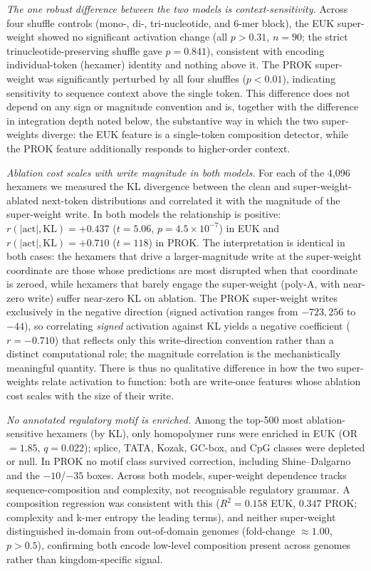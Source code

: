 \documentclass[11pt]{article}
\begin{document}
\textit{The one robust difference between the two models is
context-sensitivity.} Across four shuffle controls (mono-, di-,
tri-nucleotide, and 6-mer block), the EUK super-weight showed no
significant activation change (all $p > 0.31$, $n=90$; the strict
trinucleotide-preserving shuffle gave $p = 0.841$), consistent with
encoding individual-token (hexamer) identity and nothing above it. The
PROK super-weight was significantly perturbed by all four shuffles
($p < 0.01$), indicating sensitivity to sequence context above the
single token. This difference does not depend on any sign or magnitude
convention and is, together with the difference in integration depth
noted below, the substantive way in which the two super-weights diverge:
the EUK feature is a single-token composition detector, while the PROK
feature additionally responds to higher-order context.

\textit{Ablation cost scales with write magnitude in both models.} For
each of the 4{,}096 hexamers we measured the KL divergence between the
clean and super-weight-ablated next-token distributions and correlated
it with the magnitude of the super-weight write. In both models the
relationship is positive: $r(|\mathrm{act}|, \mathrm{KL}) = +0.437$
($t = 5.06$, $p = 4.5\times10^{-7}$) in EUK and
$r(|\mathrm{act}|, \mathrm{KL}) = +0.710$ ($t = 118$) in PROK. The
interpretation is identical in both cases: the hexamers that drive a
larger-magnitude write at the super-weight coordinate are those whose
predictions are most disrupted when that coordinate is zeroed, while
hexamers that barely engage the super-weight (poly-A, with near-zero
write) suffer near-zero KL on ablation. The PROK super-weight writes
exclusively in the negative direction (signed activation ranges from
$-723{,}256$ to $-44$), so correlating \emph{signed} activation against
KL yields a negative coefficient ($r = -0.710$) that reflects only this
write-direction convention rather than a distinct computational role;
the magnitude correlation is the mechanistically meaningful quantity.
There is thus no qualitative difference in how the two super-weights
relate activation to function: both are write-once features whose
ablation cost scales with the size of their write.

\textit{No annotated regulatory motif is enriched.} Among the top-500
most ablation-sensitive hexamers (by KL), only homopolymer runs were
enriched in EUK (OR $= 1.85$, $q = 0.022$); splice, TATA, Kozak,
GC-box, and CpG classes were depleted or null. In PROK no motif class
survived correction, including Shine--Dalgarno and the $-10$/$-35$
boxes. Across both models, super-weight dependence tracks
sequence-composition and complexity, not recognisable regulatory
grammar. A composition regression was consistent with this
($R^2 = 0.158$ EUK, $0.347$ PROK; complexity and k-mer entropy the
leading terms), and neither super-weight distinguished in-domain from
out-of-domain genomes (fold-change $\approx 1.00$, $p > 0.5$), confirming
both encode low-level composition present across genomes rather than
kingdom-specific signal.
\end{document}
